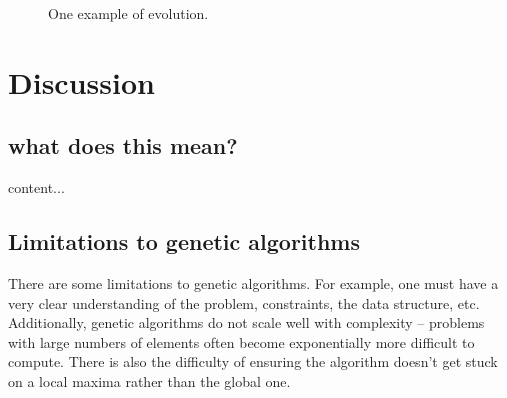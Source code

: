 \documentclass[11pt]{article}
\begin{document}
\begin{figure}
  \label{fig:gen-info_pid3095791}
  \centering
  \caption{One example of evolution.}
  \label{fig:multi-step}
\end{figure}

\begin{figure}
\end{figure}

\section{Discussion}
\label{sec:org7999995}
\subsection{what does this mean?}
\label{sec:orgf7b36ed}
content...

\subsection{Limitations to genetic algorithms}
\label{sec:org148bf83}
There are some limitations to genetic algorithms. For example, one must
have a very clear understanding of the problem, constraints, the data
structure, etc. Additionally, genetic algorithms do not scale well with
complexity -- problems with large numbers of elements often become exponentially
more difficult to compute. There is also the difficulty of ensuring the
algorithm doesn't get stuck on a local maxima rather than the global one.
\end{document}
